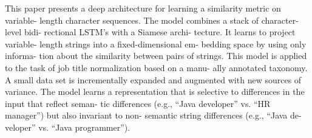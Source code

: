 This paper presents a deep architecture for learning a similarity metric on variable- length character sequences. The model combines a stack of character-level bidi- rectional LSTM's with a Siamese archi- tecture. It learns to project variable- length strings into a fixed-dimensional em- bedding space by using only informa- tion about the similarity between pairs of strings. This model is applied to the task of job title normalization based on a manu- ally annotated taxonomy. A small data set is incrementally expanded and augmented with new sources of variance. The model learns a representation that is selective to differences in the input that reflect seman- tic differences (e.g., ``Java developer'' vs. ``HR manager'') but also invariant to non- semantic string differences (e.g., ``Java de- veloper'' vs. ``Java programmer'').

